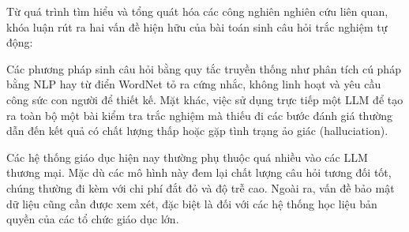 Từ quá trình tìm hiểu và tổng quát hóa các công nghiên nghiên cứu liên quan, khóa luận rút ra hai vấn đề hiện hữu của bài toán sinh câu hỏi trắc nghiệm tự động:

 Các phương pháp sinh câu hỏi bằng quy tắc truyền thống như phân tích cú pháp bằng NLP hay từ điển WordNet tỏ ra cứng nhắc, không linh hoạt và yêu cầu công sức con người để thiết kế. Mặt khác, việc sử dụng trực tiếp một LLM để tạo ra toàn bộ một bài kiểm tra trắc nghiệm mà thiếu đi các bước đánh giá thường dẫn đến kết quả có chất lượng thấp hoặc gặp tình trạng ảo giác (halluciation).

 Các hệ thống giáo dục hiện nay thường phụ thuộc quá nhiều vào các LLM thương mại. Mặc dù các mô hình này đem lại chất lượng câu hỏi tương đối tốt, chúng thường đi kèm với chi phí đắt đỏ và độ trễ cao. Ngoài ra, vấn đề bảo mật dữ liệu cũng cần được xem xét, đặc biệt là đối với các hệ thống học liệu bản quyền của các tổ chức giáo dục lớn.





